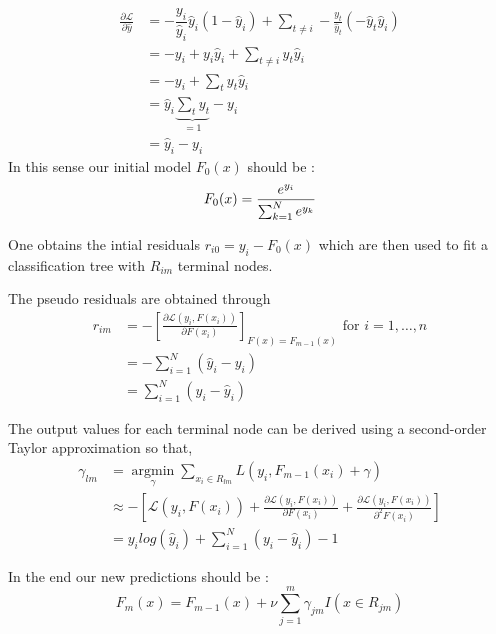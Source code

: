 \documentclass[12pt,a4paper,onecolumn,oneside,draft=on]{article}
\begin{document}
\begin{equation}
\begin{aligned}
\frac{\partial \mathcal{L}}{\partial \hat{y}} &=-\dfrac{y_{i}}{\hat{y}_{i}} \hat{y}_{i}\left(1-\hat{y}_{i}\right)+\sum_{t \neq i}-\frac{y_{t}}{\hat{y}_{t}}\left(-\hat{y}_{t} \hat{y}_{i}\right)\\
&=-y_{i}+y_{i} \hat{y}_{i}+\sum_{t \neq i} y_{t} \hat{y}_{i} \\
&=-y_{i}+\sum_{t} y_{t} \hat{y}_{i}\\
& =\hat{y}_{i} \underbrace{\sum_{t} y_{t}}_{=1}-y_{i}\\
& = \hat{y}_i - y_i
\end{aligned}
\end{equation}
In this sense our initial model $F_0(x)$ should be :
\begin{equation}
F_{0}(x)= \dfrac{e^{y_i}}{\sum_{k=1}^N e^{y_k}}  \\
\end{equation}




One obtains the intial residuals $r_{i0}=y_i - F_0(x)$ which are then used to fit a classification tree with $R_{im}$ terminal nodes.

The pseudo residuals are obtained through
\begin{equation}
\begin{aligned}
r_{im} &= -\left[\frac{\partial \mathcal{L}\left(y_{i}, F\left(x_{i}\right)\right)}{\partial F\left(x_{i}\right)}\right]_{F(x)=F_{m-1}(x)} \text { for } i=1, \ldots, n \\
&= -\sum_{i = 1}^N(\hat{y}_i - y_i) \\
&= \sum_{i = 1}^N (y_i -\hat{y}_i)
\end{aligned}
\end{equation}

The output values for each terminal node can be derived using a second-order Taylor approximation so that,
\begin{equation}
\begin{aligned}
\gamma_{lm} &= \underset{\gamma}{\operatorname{argmin}} \sum_{x_{i} \in R_{lm}} L\left(y_{i}, F_{m-1}\left(x_{i}\right)+\gamma\right) \\ 
&\approx - \left[\mathcal{L}\left(y_{i}, F\left(x_{i}\right)\right) +  \frac{\partial \mathcal{L}\left(y_{i}, F\left(x_{i}\right)\right)}{\partial F\left(x_{i}\right)} + \frac{\partial \mathcal{L}\left(y_{i}, F\left(x_{i}\right)\right)}{\partial^2 F\left(x_{i}\right)}\right] \\
&=  y_ilog(\hat{y}_i) + \sum_{i = 1}^N (y_i -\hat{y}_i)   - 1
\end{aligned}
\end{equation}


In the end our new predictions should be :
\begin{equation}
F_{m}(x)=F_{m-1}(x)+\nu \sum_{j=1}^{m} \gamma_{j m} I\left(x \in R_{j m}\right)
\end{equation}
\end{document}
